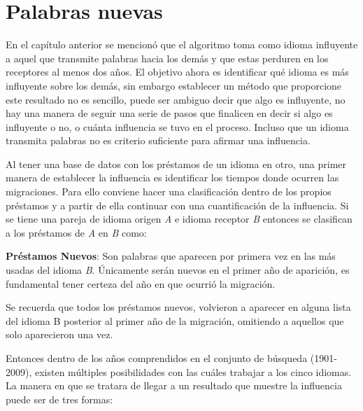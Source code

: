 

\chapter{Palabras nuevas}

En el capítulo anterior se mencionó que el algoritmo toma como  idioma influyente a aquel que transmite palabras hacia los demás y que estas perduren en los receptores al menos dos años.   El objetivo ahora es identificar qué idioma es más influyente sobre los demás, sin embargo establecer un método que proporcione este resultado no es sencillo,  puede ser ambiguo decir que algo es influyente, no hay una manera de seguir una serie de pasos que finalicen en decir si algo es influyente o no,  o cuánta influencia se tuvo en el proceso.  Incluso que un idioma transmita palabras no es criterio suficiente para afirmar una influencia.  

Al tener una base de datos  con los préstamos de un idioma en otro,  una primer manera de establecer la influencia es  identificar los tiempos donde ocurren las migraciones.  Para ello conviene hacer una clasificación dentro de los propios préstamos y a partir de ella  continuar con una cuantificación de la influencia.  Si se tiene una pareja de idioma origen \textit{A} e idioma receptor \textit{B} entonces se clasifican a los préstamos de \textit{A} en \textit{B} como:

\hfill\break

\textbf{Préstamos Nuevos}: Son palabras que aparecen por primera vez en las más usadas del idioma \textit{B}.  Únicamente serán nuevos en el primer año de aparición,  es fundamental tener certeza del año en que ocurrió la migración. 

\hfill\break

Se recuerda que todos los préstamos nuevos, volvieron a aparecer en alguna lista del idioma B posterior al primer año de la migración, omitiendo a aquellos que solo aparecieron una vez. 

Entonces dentro de los años comprendidos en el conjunto de búsqueda (1901-2009), existen múltiples posibilidades con las cuáles trabajar a los cinco idiomas. La manera en que se tratara de llegar a un resultado que muestre la influencia puede ser de tres formas:

\newpage

